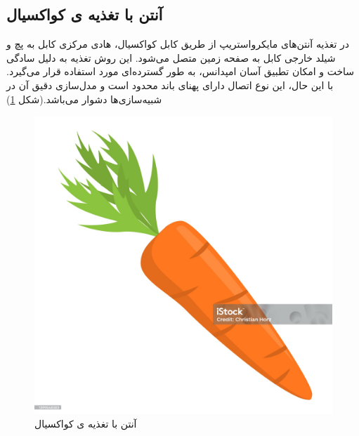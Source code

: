 \subsection{آنتن با تغذیه ی کواکسیال}
در تغذیه آنتن‌های مایکرواستریپ از طریق کابل کواکسیال، هادی مرکزی کابل به پچ و شیلد خارجی کابل به صفحه زمین متصل می‌شود. این روش تغذیه به دلیل سادگی ساخت و امکان تطبیق آسان امپدانس، به طور گسترده‌ای مورد استفاده قرار می‌گیرد. با این حال، این نوع اتصال دارای پهنای باند محدود است و مدل‌سازی دقیق آن در شبیه‌سازی‌ها دشوار می‌باشد.(شکل
\ref{fig6})
\begin{figure}
	\centering
	\includegraphics[scale=0.3]{Images/aaa.jpg}
	\caption{آنتن با تغذیه ی کواکسیال}
	\label{fig6}
\end{figure}


